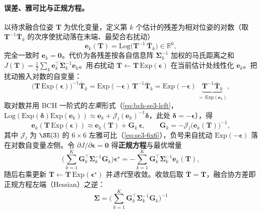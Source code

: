 \paragraph{误差、雅可比与正规方程。}以待求融合位姿 $\mathbf{T}$ 为优化变量，定义第 $k$ 个估计的残差为相对位姿的对数（取 $\mathbf{T}^{-1}\bar{\mathbf{T}}_k$ 的次序使扰动落在末端、最契合右扰动）
\begin{equation}
  \mathbf{e}_k(\mathbf{T})=\mathrm{Log}\big(\mathbf{T}^{-1}\,\bar{\mathbf{T}}_k\big)\in\mathbb{R}^6,
  \label{eq:fusion-error}
\end{equation}
完全一致时 $\mathbf{e}_k=\mathbf{0}$。代价为各残差按各自信息阵 $\boldsymbol{\Sigma}_k^{-1}$ 加权的马氏距离之和 $J(\mathbf{T})=\tfrac12\sum_k\mathbf{e}_k^\top\boldsymbol{\Sigma}_k^{-1}\mathbf{e}_k$。用\emph{右}扰动 $\mathbf{T}\leftarrow\mathbf{T}\,\mathrm{Exp}(\boldsymbol{\epsilon})$ 在当前估计处线性化 $\mathbf{e}_k$。把扰动搬入对数的自变量：
\[
  \big(\mathbf{T}\,\mathrm{Exp}(\boldsymbol{\epsilon})\big)^{-1}\bar{\mathbf{T}}_k
  =\mathrm{Exp}(-\boldsymbol{\epsilon})\,\mathbf{T}^{-1}\bar{\mathbf{T}}_k
  =\mathrm{Exp}(-\boldsymbol{\epsilon})\,\underbrace{\mathbf{T}^{-1}\bar{\mathbf{T}}_k}_{=\,\mathrm{Exp}(\mathbf{e}_k)},
\]
取对数并用 BCH 一阶式的\emph{左乘}形式（\cref{eq:bch-se3-left}，$\mathrm{Log}(\mathrm{Exp}(\boldsymbol{\delta})\mathrm{Exp}(\mathbf{e}_k))\approx\mathbf{e}_k+\boldsymbol{\mathcal{J}}_l(\mathbf{e}_k)^{-1}\boldsymbol{\delta}$，此处 $\boldsymbol{\delta}=-\boldsymbol{\epsilon}$），得
\begin{equation}
  \mathbf{e}_k(\mathbf{T}\,\mathrm{Exp}(\boldsymbol{\epsilon}))\approx\mathbf{e}_k(\mathbf{T})+\mathbf{G}_k\,\boldsymbol{\epsilon},
  \qquad
  \mathbf{G}_k=-\boldsymbol{\mathcal{J}}_l\!\big(\mathbf{e}_k(\mathbf{T})\big)^{-1},
  \label{eq:fusion-jacobian}
\end{equation}
其中 $\boldsymbol{\mathcal{J}}_l$ 为 $\SE(3)$ 的 $6\times6$ 左雅可比（\cref{eq:se3-6x6}），负号来自扰动 $\mathrm{Exp}(-\boldsymbol{\epsilon})$ 落在对数自变量\emph{左}侧。令 $\partial J/\partial\boldsymbol{\epsilon}=\mathbf{0}$ 得\textbf{正规方程}与最优增量
\begin{equation}
  \Big(\sum_{k=1}^{K}\mathbf{G}_k^\top\boldsymbol{\Sigma}_k^{-1}\mathbf{G}_k\Big)\boldsymbol{\epsilon}^\star
  =-\sum_{k=1}^{K}\mathbf{G}_k^\top\boldsymbol{\Sigma}_k^{-1}\mathbf{e}_k(\mathbf{T}),
  \label{eq:fusion-normal}
\end{equation}
随后右乘更新 $\mathbf{T}\leftarrow\mathbf{T}\,\mathrm{Exp}(\boldsymbol{\epsilon}^\star)$ 并\emph{迭代}至收敛。收敛后取 $\bar{\mathbf{T}}=\mathbf{T}$，融合协方差即正规方程左端（Hessian）之逆：
\begin{equation}
  \boxed{\;\boldsymbol{\Sigma}=\Big(\sum_{k=1}^{K}\mathbf{G}_k^\top\boldsymbol{\Sigma}_k^{-1}\mathbf{G}_k\Big)^{-1}\;}
  \label{eq:fusion-cov}
\end{equation}


